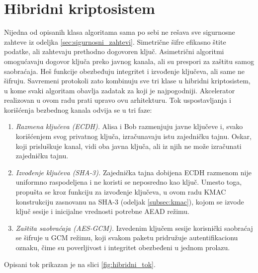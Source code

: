\begin{table}[H]
\caption{Poređenje klasa kriptografskih algoritama}
\centering
\setlength{\tabcolsep}{5pt}
\renewcommand{\arraystretch}{1.4}
\label{tab:klase}
\end{table}

\section{Hibridni kriptosistem}
\label{sec:hibridni_sistem}

Nijedna od opisanih klasa algoritama sama po sebi ne rešava sve sigurnosne zahteve iz odeljka \ref{sec:sigurnosni_zahtevi}. Simetrične šifre efikasno štite podatke, ali zahtevaju prethodno dogovoren ključ. Asimetrični algoritmi omogućavaju dogovor ključa preko javnog kanala, ali su prespori za zaštitu samog saobraćaja. Heš funkcije obezbeđuju integritet i izvođenje ključeva, ali same ne šifruju. Savremeni protokoli zato kombinuju sve tri klase u hibridni kriptosistem, u kome svaki algoritam obavlja zadatak za koji je najpogodniji.
\smallbreak
Akcelerator realizovan u ovom radu prati upravo ovu arhitekturu. Tok uspostavljanja i korišćenja bezbednog kanala odvija se u tri faze:
\begin{enumerate}[itemsep=2pt]
    \item \textit{Razmena ključeva (ECDH).} Alisa i Bob razmenjuju javne ključeve i, svako korišćenjem svog privatnog ključa, izračunavaju istu zajedničku tajnu. Oskar, koji prisluškuje kanal, vidi oba javna ključa, ali iz njih ne može izračunati zajedničku tajnu.
    \item \textit{Izvođenje ključeva (SHA-3).} Zajednička tajna dobijena ECDH razmenom nije uniformno raspodeljena i ne koristi se neposredno kao ključ. Umesto toga, propušta se kroz funkciju za izvođenje ključeva, u ovom radu KMAC konstrukciju zasnovanu na SHA-3 (odeljak \ref{subsec:kmac}), kojom se izvode ključ sesije i inicijalne vrednosti potrebne AEAD režimu.
    \item \textit{Zaštita saobraćaja (AES-GCM).} Izvedenim ključem sesije korisnički saobraćaj se šifruje u GCM režimu, koji svakom paketu pridružuje autentifikacionu oznaku, čime su poverljivost i integritet obezbeđeni u jednom prolazu.
\end{enumerate}
\smallbreak
Opisani tok prikazan je na slici \ref{fig:hibridni_tok}.

